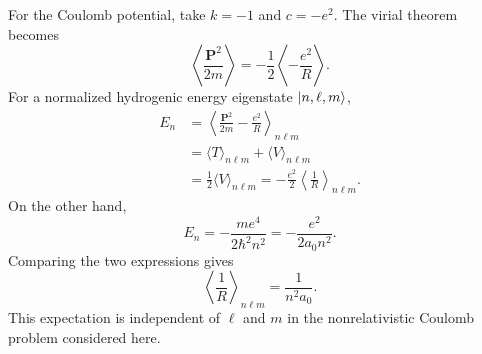For the Coulomb potential, take $k=-1$ and $c=-e^2$. The virial theorem
becomes
\[
 \left\langle\frac{\mathbf P^2}{2m}\right\rangle
 =-\frac12\left\langle-\frac{e^2}{R}\right\rangle.
\]
For a normalized hydrogenic energy eigenstate $\lvert n,\ell,m\rangle$,
\begin{align*}
 E_n
 &=\left\langle\frac{\mathbf P^2}{2m}-\frac{e^2}{R}\right\rangle_{n\ell m}\\
 &=\langle T\rangle_{n\ell m}+\langle V\rangle_{n\ell m}\\
 &=\frac12\langle V\rangle_{n\ell m}
 =-\frac{e^2}{2}\left\langle\frac1R\right\rangle_{n\ell m}.
\end{align*}
On the other hand,
\[
 E_n=-\frac{me^4}{2\hbar^2n^2}
 =-\frac{e^2}{2a_0n^2}.
\]
Comparing the two expressions gives
\[
 \boxed{\left\langle\frac1R\right\rangle_{n\ell m}
 =\frac1{n^2a_0}.}
\]
This expectation is independent of $\ell$ and $m$ in the
nonrelativistic Coulomb problem considered here.
